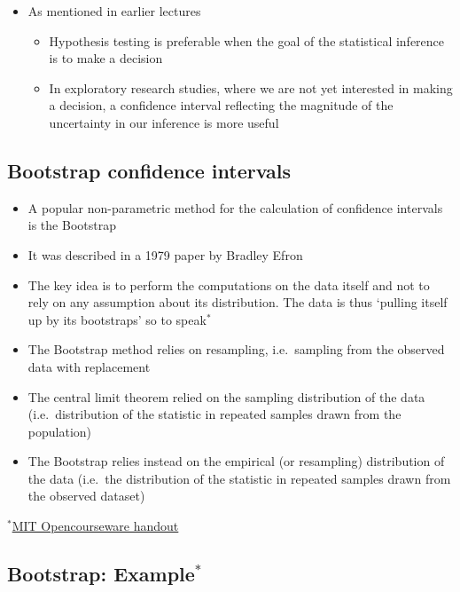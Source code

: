 \documentclass[
]{book}
\providecommand{\tightlist}{%
  \setlength{\itemsep}{0pt}\setlength{\parskip}{0pt}}
\begin{document}
\begin{itemize}
\tightlist
\item
  As mentioned in earlier lectures

  \begin{itemize}
  \tightlist
  \item
    Hypothesis testing is preferable when the goal of the statistical inference is to make a decision
  \item
    In exploratory research studies, where we are not yet interested in making a decision, a confidence interval reflecting the magnitude of the uncertainty in our inference is more useful
  \end{itemize}
\end{itemize}

\hypertarget{bootstrap-confidence-intervals}{%
\subsection{Bootstrap confidence intervals}\label{bootstrap-confidence-intervals}}

\begin{itemize}
\tightlist
\item
  A popular non-parametric method for the calculation of confidence intervals is the Bootstrap
\item
  It was described in a 1979 paper by Bradley Efron
\item
  The key idea is to perform the computations on the data itself and not to rely on any assumption about its distribution. The data is thus `pulling itself up by its bootstraps' so to speak\(^*\)
\item
  The Bootstrap method relies on resampling, i.e.~sampling from the observed data with replacement
\item
  The central limit theorem relied on the sampling distribution of the data (i.e.~distribution of the statistic in repeated samples drawn from the population)
\item
  The Bootstrap relies instead on the empirical (or resampling) distribution of the data (i.e.~the distribution of the statistic in repeated samples drawn from the observed dataset)
\end{itemize}

\(^*\)\href{https://ocw.mit.edu/courses/mathematics/18-05-introduction-to-probability-and-statistics-spring-2014/readings/MIT18_05S14_Reading24.pdf}{MIT Opencourseware handout}

\hypertarget{bootstrap-example}{%
\subsection{\texorpdfstring{Bootstrap: Example\(^*\)}{Bootstrap: Example\^{}*}}\label{bootstrap-example}}
\end{document}
